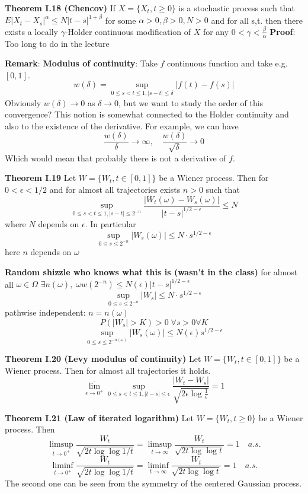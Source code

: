 \documentclass[english]{article}
\newcommand{\note}[1]{\noindent\textbf{#1}}
\begin{document}
\note{Theorem I.18 (Chencov)} If $X=\{X_t, t\geq 0\}$ is a stochastic process such that  $E|X_t - X_s|^\alpha \leq N|t-s|^{1+\beta}$ for some $\alpha > 0, \beta > 0, N>0$ and for all s,t. then there exists a locally $\gamma$-Holder continuous modification of $X$ for any $0<\gamma < \frac{\beta}{\alpha}$ \newline
\textbf{Proof}: Too long to do in the lecture\newline

\note{Remark}: \textbf{Modulus of continuity}: Take $f$ continuous function and take e.g. $[0,1]$. 
$$w(\delta) = \sup_{0\leq s <t \leq 1, |s-t|\leq \delta} |f(t) - f(s)|$$
Obviously $w(\delta) \to 0$ as $\delta \to 0$, but we want to study the order of this convergence? This notion is somewhat connected to the Holder continuity and also to the existence of the derivative. For example, we can have
$$\frac{w(\delta)}{\delta} \to \infty,\quad \frac{w(\delta)}{\sqrt \delta} \to 0$$
Which would mean that probably there is not a derivative of $f$. \newline

\note{Theorem I.19} Let $W=\{W_t, t\in [0,1]\}$ be a Wiener process. Then for $0 < \epsilon < 1/2$ and for almost all trajectories exists $n>0$ such that
$$\sup_{0\leq s<t\leq 1, |s-t| \leq 2^{-n}} \frac{|W_t(\omega) - W_s (\omega)|}{|t-s|^{1/2 - \epsilon}} \leq N$$
where $N$ depends on $\epsilon$. In particular
$$\sup_{0\leq s \leq 2^{-n}} |W_s (\omega) | \leq N\cdot s^{1/2-\epsilon}$$
here $n$ depends on $\omega$ \newline

\note{Random shizzle who knows what this is (wasn't in the class)}
for almost all $\omega \in \Omega$ \newline
$\exists n(\omega),\; \omega w(2^{-n}) \leq N(\epsilon)|t-s|^{1/2-\epsilon}$\newline
$$\sup_{0\leq s \leq 2^{-n}} |W_s| \leq N\cdot s^{1/2-\epsilon}$$
pathwise independent: $n=n(\omega)$
$$P(|W_s|> K) > 0 \; \forall s>0 \forall K$$
$$\sup_{0\leq s \leq 2^{-n(\omega)}} |W_s(\omega) | \leq N(\epsilon) s^{1/2 - \epsilon}$$

\note{Theorem I.20 (Levy modulus of continuity)} Let $W=\{W_t, t\in [0,1]\}$ be a Wiener process. Then for almost all trajectories it holds.
$$\overline{\lim_{\epsilon\to 0^+}} \sup_{0\leq s < t \leq 1, |t-s| \leq \epsilon} \frac {|W_t - W_s|}{\sqrt{2\epsilon \log \frac 1\epsilon}} =  1$$

\note{Theorem I.21 (Law of iterated logarithm)} Let $W=\{W_t, t\geq 0\}$ be a Wiener process. Then
$$\limsup_{t\to 0^+} \frac{W_t}{\sqrt {2t \log \log 1/t}} = \limsup_{t\to \infty} \frac{W_t}{\sqrt{2t \log \log t}} = 1 \quad a.s.$$
$$\liminf_{t\to 0^+} \frac{W_t}{\sqrt {2t \log \log 1/t}} = \liminf_{t\to \infty} \frac{W_t}{\sqrt{2t \log \log t}} = 1 \quad a.s.$$
The second one can be seen from the symmetry of the centered Gaussian process. \newline
\end{document}
